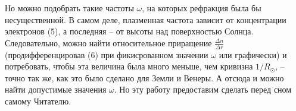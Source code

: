 \begin{multicols}{2}
        \par
        Но можно подобрать такие частоты $\omega$, на которых рефракция была бы несущественной. В самом деле, плазменная частота зависит от концентрации электронов (5), а последняя – от высоты над поверхностью Солнца. Следовательно, можно найти относительное приращение $\frac{\Delta n}{\Delta r}$ (продифференцировав (6) при фикисрованном значении $\omega$ или графически) и потребовать, чтобы эта величина была много меньше, чем кривизна $1/R_{\odot}$, – точно так же, как это было сделано для Земли и Венеры. А отсюда и можно найти допустимые значения $\omega$. Но эту работу предоставим сделать перед сном самому Читателю.
    \end{multicols}